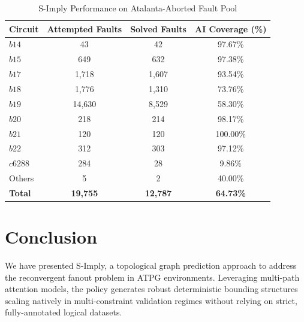 \documentclass[conference]{IEEEtran}
\begin{document}
\begin{table}[htbp]
\caption{S-Imply Performance on Atalanta-Aborted Fault Pool}
\begin{center}
\begin{tabular}{|l|c|c|c|}
\hline
\textbf{Circuit} & \textbf{Attempted Faults} & \textbf{Solved Faults} & \textbf{AI Coverage (\%)} \\
\hline
$b14$ & 43 & 42 & 97.67\% \\
$b15$ & 649 & 632 & 97.38\% \\
$b17$ & 1,718 & 1,607 & 93.54\% \\
$b18$ & 1,776 & 1,310 & 73.76\% \\
$b19$ & 14,630 & 8,529 & 58.30\% \\
$b20$ & 218 & 214 & 98.17\% \\
$b21$ & 120 & 120 & 100.00\% \\
$b22$ & 312 & 303 & 97.12\% \\
$c6288$ & 284 & 28 & 9.86\% \\
Others & 5 & 2 & 40.00\% \\
\hline
\textbf{Total} & \textbf{19,755} & \textbf{12,787} & \textbf{64.73\%} \\
\hline
\end{tabular}
\label{tab:atalanta_aborted}
\end{center}
\end{table}

\section{Conclusion}
We have presented S-Imply, a topological graph prediction approach to address the reconvergent fanout problem in ATPG environments. Leveraging multi-path attention models, the policy generates robust deterministic bounding structures scaling natively in multi-constraint validation regimes without relying on strict, fully-annotated logical datasets.
\end{document}
